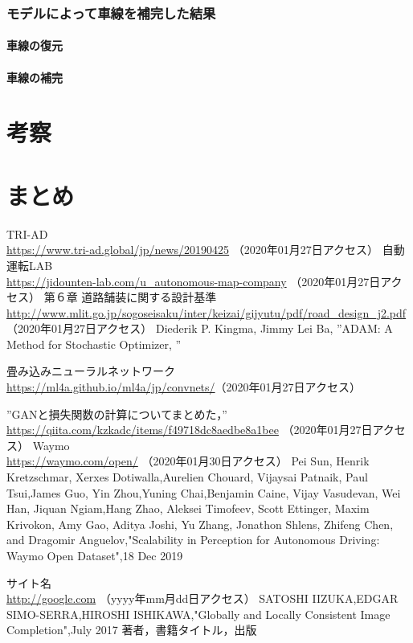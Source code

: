 \documentclass[a4j, 11pt]{jreport}
\begin{document}
\subsection{モデルによって車線を補完した結果}
\subsubsection{車線の復元}

\subsubsection{車線の補完}
\chapter{考察}
\chapter{まとめ}

\newpage
\begin{thebibliography}{1}
	TRI-AD\\ \url{https://www.tri-ad.global/jp/news/20190425} （2020年01月27日アクセス） 
	自動運転LAB\\ \url{https://jidounten-lab.com/u_autonomous-map-company} （2020年01月27日アクセス）
	第６章 道路舗装に関する設計基準\\ \url{http://www.mlit.go.jp/sogoseisaku/inter/keizai/gijyutu/pdf/road_design_j2.pdf} （2020年01月27日アクセス）
	Diederik P. Kingma, Jimmy Lei Ba, ”ADAM: A Method for Stochastic Optimizer, ”

	畳み込みニューラルネットワーク\\ \url{https://ml4a.github.io/ml4a/jp/convnets/}（2020年01月27日アクセス）

	”GANと損失関数の計算についてまとめた，” \\
	\url{https://qiita.com/kzkadc/items/f49718dc8aedbe8a1bee} （2020年01月27日アクセス）
	Waymo\\ \url{https://waymo.com/open/} （2020年01月30日アクセス）
	Pei Sun, Henrik Kretzschmar, Xerxes Dotiwalla,Aurelien Chouard, Vijaysai Patnaik, Paul Tsui,James Guo, Yin Zhou,Yuning Chai,Benjamin Caine, Vijay Vasudevan, Wei Han, Jiquan Ngiam,Hang Zhao, Aleksei Timofeev, Scott Ettinger, Maxim Krivokon, Amy Gao, Aditya Joshi, Yu	Zhang, Jonathon Shlens, Zhifeng Chen, and Dragomir Anguelov,"Scalability in Perception for Autonomous Driving: Waymo Open Dataset",18 Dec 2019
	
	サイト名\\ \url{http://google.com} （yyyy年mm月dd日アクセス） %
	SATOSHI IIZUKA,EDGAR SIMO-SERRA,HIROSHI ISHIKAWA,"Globally and Locally Consistent Image Completion",July 2017
著者，書籍タイトル，出版                                      %
\end{thebibliography}
\newpage

\end{document}

